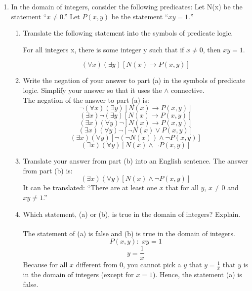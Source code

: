\documentclass[12pt]{article}
\begin{document}
\begin{enumerate}
      \item In the domain of integers, consider the following predicates: Let N(x) be the statement “$x \neq 0$.” Let $P(x, y)$ be the statement “$xy = 1.$”
            \begin{enumerate}
                  \item Translate the following statement into the symbols of predicate logic.
                        \begin{center}
                              For all integers x, there is some integer y such that if $x \neq 0$, then $xy = 1$.
                        \end{center}
                        \[(\forall x)(\exists y)[N(x) \rightarrow P(x,y)]\]
                  \item Write the negation of your answer to part (a) in the symbols of predicate logic. Simplify your answer so that it uses the $\wedge$ connective.\\
                        The negation of the answer to part (a) is:
                        \[\neg(\forall x)(\exists y)[N(x) \rightarrow P(x,y)]\]
                        \[(\exists x)\neg(\exists y)[N(x) \rightarrow P(x,y)]\]
                        \[(\exists x)(\forall y)\neg[N(x) \rightarrow P(x,y)]\]
                        \[(\exists x)(\forall y)\neg[\neg N(x) \vee P(x,y)]\]
                        \[(\exists x)(\forall y)[\neg (\neg N(x)) \wedge \neg P(x,y)]\]
                        \[(\exists x)(\forall y)[N(x) \wedge \neg P(x,y)]\]
                  \item Translate your answer from part (b) into an English sentence.
                        The answer from part (b) is:
                        \[(\exists x)(\forall y)[N(x) \wedge \neg P(x,y)]\]
                        It can be translated: \textquotedblleft There are at least one $x$ that for all $y$, $x \neq 0$ and $xy \neq 1$.\textquotedblright
                  \item Which statement, (a) or (b), is true in the domain of integers? Explain.\\~\\
                        The statement of (a) is false and (b) is true in the domain of integers.\\
                        \[P(x,y):\text{~}xy = 1\]
                        \[{\displaystyle y = \frac{1}{x}}\]
                        Because for all $x$ different from 0, you cannot pick a $y$ that ${\displaystyle y = \frac{1}{x}}$ that $y$ is in the domain of integers (except for $x = 1$). Hence, the statement (a) is false.\\~\\

\end{enumerate}
\end{enumerate}
\end{document}
